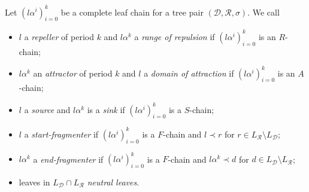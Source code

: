\documentclass[12pt]{amsart}
\newcommand{\D}{\mathcal{D}}
\newcommand{\R}{\mathcal{R}}
\begin{document}
    \begin{definition}\label{types-of-leaves}
    
        Let $(l \alpha^i)_{i=0}^k$ be a complete leaf chain for a tree pair $(\D,\R,\sigma)$. We call
    
        \begin{itemize}
        
            \item $l$ a \textit{repeller} of period $k$ and $l \alpha^k$ a \textit{range of repulsion} if $(l \alpha^i)_{i=0}^k$ is an $R$-chain;
            
            \item $l \alpha^k$ an \textit{attractor} of period $k$ and $l$ a \textit{domain of attraction} if $(l \alpha^i)_{i=0}^k$ is an $A$-chain;
            
            \item $l$ a \textit{source} and $l \alpha^k$ is a \textit{sink} if $(l \alpha^i)_{i=0}^k$ is a $S$-chain;
            
            \item $l$ a \textit{start-fragmenter} if $(l \alpha^i)_{i=0}^k$ is a $F$-chain and $l \prec r$ for $r \in L_\R \setminus L_\D$;
            \item $l\alpha^k$ a \textit{end-fragmenter} if $(l \alpha^i)_{i=0}^k$ is a $F$-chain and $l\alpha^k \prec d$ for $d \in L_\D \setminus L_\R$;
            
            \item leaves in $L_\D \cap L_\R$ \textit{neutral leaves}.
            
            
        \end{itemize}
    
    \end{definition}
    
\end{document}
